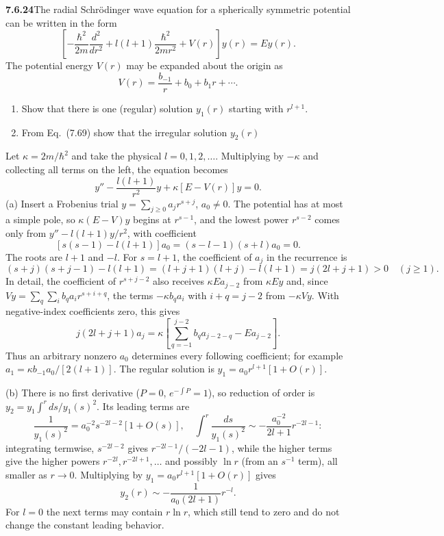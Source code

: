 \par\bigskip
\noindent\textbf{7.6.24}\quad The radial Schr\"odinger wave equation for a
spherically symmetric potential can be written in the form
\[
\left[-\frac{\hbar^{2}}{2m}\frac{d^{2}}{dr^{2}}
+l(l+1)\frac{\hbar^{2}}{2mr^{2}}+V(r)\right]y(r)=Ey(r).
\]
The potential energy $V(r)$ may be expanded about the origin as
\[
V(r)=\frac{b_{-1}}{r}+b_{0}+b_{1}r+\cdots.
\]
\begin{enumerate}
\item[(a)] Show that there is one (regular) solution $y_{1}(r)$ starting with
  $r^{l+1}$.
\item[(b)] From Eq.~(7.69) show that the irregular solution $y_{2}(r)$
\end{enumerate}
\solution
Let $\kappa=2m/\hbar^2$ and take the physical $l=0,1,2,\ldots$.
Multiplying by $-\kappa$ and collecting all terms on the left, the
equation becomes
\[
y''-\frac{l(l+1)}{r^2}y+\kappa[E-V(r)]y=0.
\]
(a) Insert a Frobenius trial $y=\sum_{j\ge0}a_jr^{s+j}$, $a_0\ne0$.
The potential has at most a simple pole, so $\kappa(E-V)y$ begins at
$r^{s-1}$, and the lowest power $r^{s-2}$ comes only from
$y''-l(l+1)y/r^2$, with coefficient
\[
[s(s-1)-l(l+1)]a_0=(s-l-1)(s+l)a_0=0.
\]
The roots are $l+1$ and $-l$. For $s=l+1$, the coefficient of $a_j$
in the recurrence is
\[
(s+j)(s+j-1)-l(l+1)=(l+j+1)(l+j)-l(l+1)=j(2l+j+1)>0\quad(j\ge1).
\]
In detail, the coefficient of $r^{s+j-2}$ also receives
$\kappa Ea_{j-2}$ from $\kappa Ey$ and, since
$Vy=\sum_q\sum_ib_qa_ir^{s+i+q}$, the terms $-\kappa b_qa_i$ with
$i+q=j-2$ from $-\kappa Vy$. With negative-index coefficients zero,
this gives
\[
j(2l+j+1)a_j
=\kappa\left[\sum_{q=-1}^{j-2}b_q a_{j-2-q}-Ea_{j-2}\right].
\]
Thus an arbitrary nonzero $a_0$ determines every following coefficient;
for example $a_1=\kappa b_{-1}a_0/[2(l+1)]$. The regular solution is
$\boxed{y_1=a_0r^{l+1}[1+O(r)]}$.

(b) There is no first derivative ($P=0$, $e^{-\int P}=1$), so
reduction of order is $y_2=y_1\int^rds/y_1(s)^2$. Its leading terms are
\[
\frac1{y_1(s)^2}=a_0^{-2}s^{-2l-2}[1+O(s)],
\quad
\int^r\frac{ds}{y_1(s)^2}
\sim-\frac{a_0^{-2}}{2l+1}r^{-2l-1}:
\]
integrating termwise, $s^{-2l-2}$ gives $r^{-2l-1}/(-2l-1)$, while the
higher terms give the higher powers $r^{-2l},r^{-2l+1},\ldots$ and
possibly $\ln r$ (from an $s^{-1}$ term), all smaller as $r\to0$.
Multiplying by $y_1=a_0r^{l+1}[1+O(r)]$ gives
\[
\boxed{y_2(r)\sim-\frac1{a_0(2l+1)}r^{-l}}.
\]
For $l=0$ the next terms may contain $r\ln r$, which still tend to zero
and do not change the constant leading behavior.

